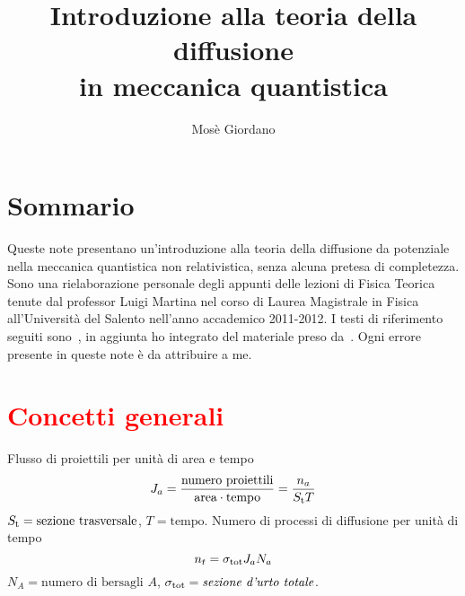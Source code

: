 \documentclass[a4paper,fleqn,twoside,12pt]{article}
\title{Introduzione alla teoria della diffusione \\ in meccanica quantistica}
\author{Mosè Giordano}
\newcommand{\completare}[1]{\textcolor{red}{#1}}
\begin{document}
\maketitle
{\small\tableofcontents}

{}
\section*{Sommario}
\label{sec:sommario}

Queste note presentano un'introduzione alla teoria della diffusione da
potenziale nella meccanica quantistica non relativistica, senza alcuna pretesa
di completezza.  Sono una rielaborazione personale degli appunti delle lezioni
di Fisica Teorica tenute dal professor Luigi Martina nel corso di Laurea
Magistrale in Fisica all'Università del Salento nell'anno accademico 2011-2012.
I testi di riferimento seguiti
sono~\textcites{ballentine:quantum-mechanics,cohen:quantum-mechanics}, in
aggiunta ho integrato del materiale preso
da~\textcites{gottfried:quantum-mechanics,griffiths:introduction-qm,
  landau:meccanica-quantistica}.
Ogni errore presente in queste note è da attribuire a me.

\section{\completare{Concetti generali}}
\label{sec:concetti-generali}

Flusso di proiettili per unità di area e tempo
\begin{equation}
  J_{a} = \frac{\text{numero proiettili}}{\text{area}\cdot\text{tempo}} =
  \frac{n_{a}}{S_{\textup{t}} T}
\end{equation}
$S_{\textup{t}} = \text{sezione trasversale}$, $T = \text{tempo}$.  Numero di
processi di diffusione per unità di tempo
\begin{equation}
  n_{t} = \sigma_{\textup{tot}} J_{a} N_{a}
\end{equation}
$N_{A} = \text{numero di bersagli $A$}$,
$\sigma_{\textup{tot}} = \text{\emph{sezione d'urto totale}}$.
\end{document}

